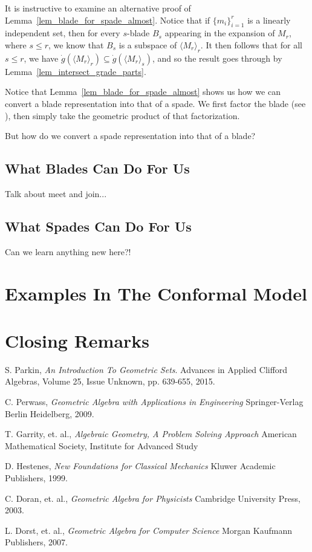 \documentclass{birkjour}
\theoremstyle{definition}
\theoremstyle{remark}
\numberwithin{equation}{section}
\newcommand{\gd}{\dot{g}}
\begin{document}
It is instructive to examine an alternative proof of Lemma~\ref{lem_blade_for_spade_almost}.  Notice that if $\{m_i\}_{i=1}^r$
is a linearly independent set, then for every $s$-blade $B_s$ appearing in the expansion of $M_r$,
where $s\leq r$, we know that $B_s$ is a subspace of $\langle M_r\rangle_r$.  It then follows that
for all $s\leq r$, we have $\gd(\langle M_r\rangle_r)\subseteq\gd(\langle M_r\rangle_s)$, and
so the result goes through by Lemma~\ref{lem_intersect_grade_parts}.

Notice that Lemma~\ref{lem_blade_for_spade_almost} shows us how we can convert a blade representation
into that of a spade.  We first factor the blade (see \cite[p. 533]{Dorst07}), then simply take the geometric
product of that factorization.

But how do we convert a spade representation into that of a blade?

\subsection{What Blades Can Do For Us}

Talk about meet and join...

\subsection{What Spades Can Do For Us}

Can we learn anything new here?!

\section{Examples In The Conformal Model}

\section{Closing Remarks}

\begin{thebibliography}{9}

S. Parkin,
\emph{An Introduction To Geometric Sets}.
Advances in Applied Clifford Algebras, Volume 25, Issue Unknown, pp. 639-655, 2015.

C. Perwass,
\emph{Geometric Algebra with Applications in Engineering}
Springer-Verlag Berlin Heidelberg, 2009.

T. Garrity, et. al.,
\emph{Algebraic Geometry, A Problem Solving Approach}
American Mathematical Society, Institute for Advanced Study

D. Hestenes,
\emph{New Foundations for Classical Mechanics}
Kluwer Academic Publishers, 1999.

C. Doran, et. al.,
\emph{Geometric Algebra for Physicists}
Cambridge University Press, 2003.

L. Dorst, et. al.,
\emph{Geometric Algebra for Computer Science}
Morgan Kaufmann Publishers, 2007.

\end{thebibliography}
\end{document}
